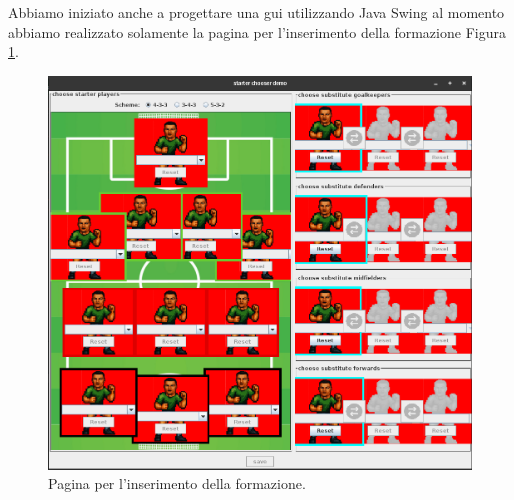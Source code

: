 Abbiamo iniziato anche a progettare una gui utilizzando Java Swing al momento
abbiamo realizzato solamente la pagina per l'inserimento della formazione Figura \ref{fig:pagina_inserisci_formazione}.
\begin{figure}
    \centering
    \includegraphics[width=\textwidth]{Resources/Mockups/InserisciFormazione.png}        
    \caption{Pagina per l'inserimento della formazione.}
    \label{fig:pagina_inserisci_formazione}
\end{figure}
